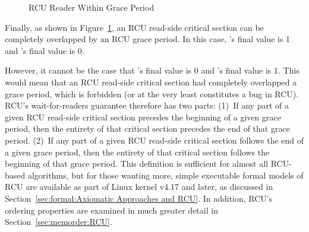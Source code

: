 \begin{figure}[tbp]
\centering
{}
\caption{RCU Reader Within Grace Period}
\label{fig:defer:RCU Reader Within Grace Period}
\end{figure}

Finally, as shown in
Figure~\ref{fig:defer:RCU Reader Within Grace Period},
an RCU read-side critical section can be completely overlapped by
an RCU grace period.
In this case, 's final value is 1 and 's final value is 0.

However, it cannot be the case that 's final value is 0 and 's
final value is 1.
This would mean that an RCU read-side critical section had completely
overlapped a grace period, which is forbidden (or at the very least
constitutes a bug in RCU).
RCU's wait-for-readers guarantee therefore has two parts:
(1)~If any part of a given RCU read-side critical section precedes
the beginning of a given grace period, then the entirety of that
critical section precedes the end of that grace period.
(2)~If any part of a given RCU read-side critical section follows
the end of a given grace period, then the entirety of that
critical section follows the beginning of that grace period.
This definition is sufficient for almost all RCU-based algorithms, but
for those wanting more,
simple executable formal models of RCU are available
as part of Linux kernel v4.17 and later, as discussed in
Section~\ref{sec:formal:Axiomatic Approaches and RCU}.
In addition, RCU's ordering properties are examined in much
greater detail in Section~\ref{sec:memorder:RCU}.

